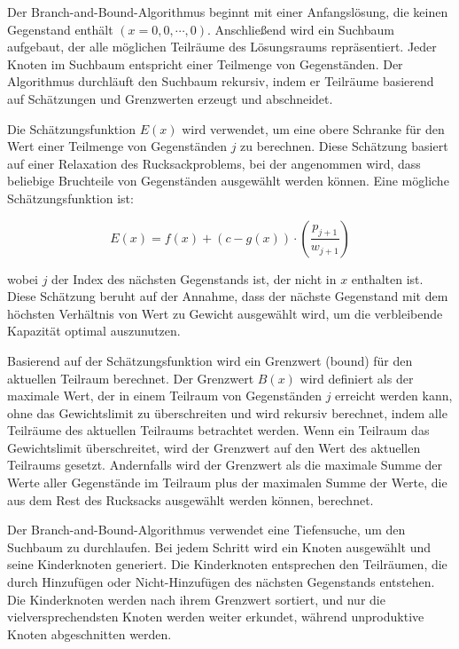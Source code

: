 Der Branch-and-Bound-Algorithmus beginnt mit einer 
Anfangslösung, die keinen Gegenstand enthält 
$(x = {0, 0, \cdots, 0})$. Anschließend wird ein Suchbaum 
aufgebaut, der alle möglichen Teilräume des Lösungsraums 
repräsentiert. Jeder Knoten im Suchbaum entspricht einer 
Teilmenge von Gegenständen. Der Algorithmus durchläuft den 
Suchbaum rekursiv, indem er Teilräume basierend auf 
Schätzungen und Grenzwerten erzeugt und abschneidet.

Die Schätzungsfunktion $E(x)$ wird verwendet, um eine obere 
Schranke für den Wert einer Teilmenge von Gegenständen $j$ zu 
berechnen. Diese Schätzung basiert auf einer Relaxation des 
Rucksackproblems, bei der angenommen wird, dass beliebige 
Bruchteile von Gegenständen ausgewählt werden können. Eine 
mögliche Schätzungsfunktion ist:

\begin{equation}
    E(x) = f(x) + (c - g(x)) \cdot \left(\frac{p_{j+1}}{w_{j+1}}\right)
\end{equation}

wobei $j$ der Index des nächsten Gegenstands ist, der nicht 
in $x$ enthalten ist. Diese Schätzung beruht auf der Annahme, 
dass der nächste Gegenstand mit dem höchsten Verhältnis von 
Wert zu Gewicht ausgewählt wird, um die verbleibende 
Kapazität optimal auszunutzen.

Basierend auf der Schätzungsfunktion wird ein Grenzwert 
(bound) für den aktuellen Teilraum berechnet. Der Grenzwert 
$B(x)$ wird definiert als der maximale Wert, der in einem 
Teilraum von Gegenständen $j$ erreicht werden kann, ohne das 
Gewichtslimit zu überschreiten und wird 
rekursiv berechnet, indem alle Teilräume des aktuellen 
Teilraums betrachtet werden. Wenn ein Teilraum das 
Gewichtslimit überschreitet, wird der Grenzwert auf den Wert 
des aktuellen Teilraums gesetzt. Andernfalls wird der 
Grenzwert als die maximale Summe der Werte aller Gegenstände 
im Teilraum plus der maximalen Summe der Werte, die aus dem 
Rest des Rucksacks ausgewählt werden können, berechnet.

Der Branch-and-Bound-Algorithmus verwendet eine Tiefensuche, 
um den Suchbaum zu durchlaufen. Bei jedem Schritt wird ein 
Knoten ausgewählt und seine Kinderknoten generiert. Die 
Kinderknoten entsprechen den Teilräumen, die durch 
Hinzufügen oder Nicht-Hinzufügen des nächsten Gegenstands 
entstehen. Die Kinderknoten werden nach ihrem Grenzwert 
sortiert, und nur die vielversprechendsten Knoten werden 
weiter erkundet, während unproduktive Knoten abgeschnitten 
werden.


